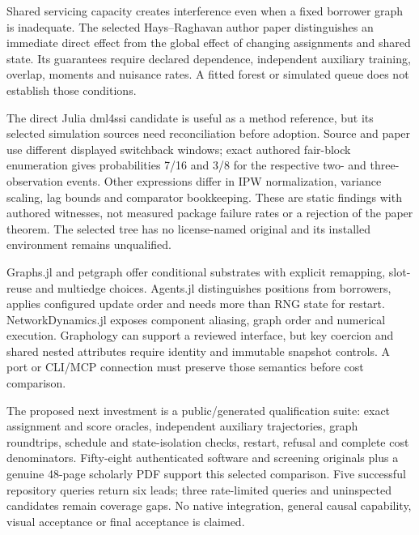 Shared servicing capacity creates interference even when a fixed
borrower graph is inadequate. The selected Hays--Raghavan author paper
distinguishes an immediate direct effect from the global effect of
changing assignments and shared state. Its guarantees require declared
dependence, independent auxiliary training, overlap, moments and
nuisance rates. A fitted forest or simulated queue does not establish
those conditions. \citep{exec25_onet_paper}

The direct Julia dml4ssi candidate is useful as a method reference, but
its selected simulation sources need reconciliation before adoption.
Source and paper use different displayed switchback windows; exact
authored fair-block enumeration gives probabilities 7/16 and 3/8 for the
respective two- and three-observation events. Other expressions differ
in IPW normalization, variance scaling, lag bounds and comparator
bookkeeping. These are static findings with authored witnesses, not
measured package failure rates or a rejection of the paper theorem. The
selected tree has no license-named original and its installed
environment remains unqualified.
\citep{exec25_onet_dml,exec25_onet_choice}

Graphs.jl and petgraph offer conditional substrates with explicit
remapping, slot-reuse and multiedge choices. Agents.jl distinguishes
positions from borrowers, applies configured update order and needs more
than RNG state for restart. NetworkDynamics.jl exposes component
aliasing, graph order and numerical execution. Graphology can support a
reviewed interface, but key coercion and shared nested attributes
require identity and immutable snapshot controls. A port or CLI/MCP
connection must preserve those semantics before cost comparison.
\citep{exec25_onet_graphs,exec25_onet_petgraph,exec25_onet_agents,exec25_onet_dynamics,exec25_onet_graphology}

The proposed next investment is a public/generated qualification suite:
exact assignment and score oracles, independent auxiliary trajectories,
graph roundtrips, schedule and state-isolation checks, restart, refusal
and complete cost denominators. Fifty-eight authenticated software and
screening originals plus a genuine 48-page scholarly PDF support this
selected comparison. Five successful repository queries return six
leads; three rate-limited queries and uninspected candidates remain
coverage gaps. No native integration, general causal capability, visual
acceptance or final acceptance is claimed. \citep{exec25_onet_choice}

